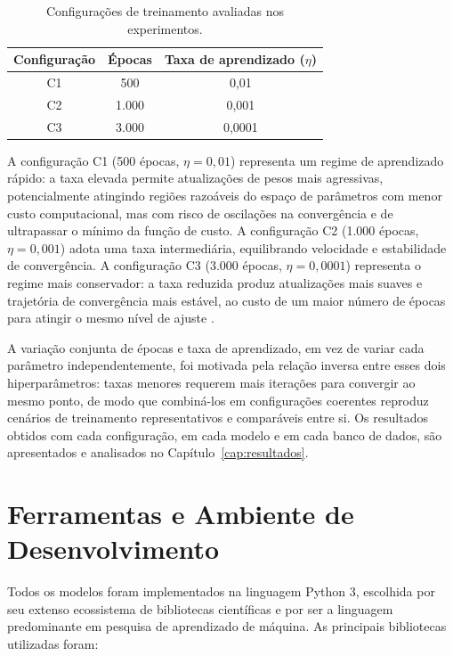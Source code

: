 \begin{table}[H]
\centering
\caption{Configurações de treinamento avaliadas nos experimentos.}
\label{tab:configuracoes}
\begin{tabular}{|c|c|c|}
\hline
\textbf{Configuração} & \textbf{Épocas} & \textbf{Taxa de aprendizado ($\eta$)} \\
\hline
C1 & 500   & 0,01   \\
C2 & 1.000 & 0,001  \\
C3 & 3.000 & 0,0001 \\
\hline
\end{tabular}
\end{table}

A configuração C1 (500 épocas, $\eta = 0{,}01$) representa um regime de aprendizado rápido: a taxa elevada permite atualizações de pesos mais agressivas, potencialmente atingindo regiões razoáveis do espaço de parâmetros com menor custo computacional, mas com risco de oscilações na convergência e de ultrapassar o mínimo da função de custo. A configuração C2 (1.000 épocas, $\eta = 0{,}001$) adota uma taxa intermediária, equilibrando velocidade e estabilidade de convergência. A configuração C3 (3.000 épocas, $\eta = 0{,}0001$) representa o regime mais conservador: a taxa reduzida produz atualizações mais suaves e trajetória de convergência mais estável, ao custo de um maior número de épocas para atingir o mesmo nível de ajuste \cite{silva2016,braga2007}.

A variação conjunta de épocas e taxa de aprendizado, em vez de variar cada parâmetro independentemente, foi motivada pela relação inversa entre esses dois hiperparâmetros: taxas menores requerem mais iterações para convergir ao mesmo ponto, de modo que combiná-los em configurações coerentes reproduz cenários de treinamento representativos e comparáveis entre si. Os resultados obtidos com cada configuração, em cada modelo e em cada banco de dados, são apresentados e analisados no Capítulo~\ref{cap:resultados}.

\section{Ferramentas e Ambiente de Desenvolvimento}

Todos os modelos foram implementados na linguagem Python 3, escolhida por seu extenso ecossistema de bibliotecas científicas e por ser a linguagem predominante em pesquisa de aprendizado de máquina. As principais bibliotecas utilizadas foram:


